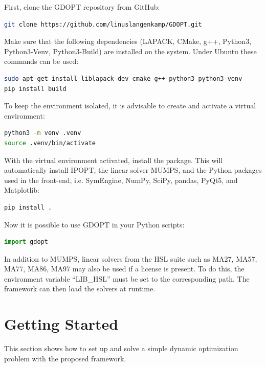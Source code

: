 \documentclass[12pt]{article}
\begin{document}
First, clone the GDOPT repository from GitHub:

\begin{lstlisting}[language=bash]
git clone https://github.com/linuslangenkamp/GDOPT.git
\end{lstlisting}

Make sure that the following dependencies (LAPACK, CMake, g++, Python3, Python3-Venv, Python3-Build) are installed on the system. Under Ubuntu these commands can be used:

\begin{lstlisting}[language=bash]
sudo apt-get install liblapack-dev cmake g++ python3 python3-venv
pip install build
\end{lstlisting}

To keep the environment isolated, it is advisable to create and activate a virtual environment:

\begin{lstlisting}[language=bash]
python3 -m venv .venv
source .venv/bin/activate
\end{lstlisting}

With the virtual environment activated, install the package. This will automatically install
IPOPT\cite{wachter2006implementation}, the linear solver MUMPS\cite{amestoy2001fully}, and the Python packages used in the front-end, i.e. SymEngine\cite{symengine}, NumPy\cite{harris2020array}, SciPy\cite{virtanen2020scipy}, pandas\cite{mckinney2010data}, PyQt5, and Matplotlib\cite{hunter2007matplotlib}:

\begin{lstlisting}[language=bash]
pip install .
\end{lstlisting}

Now it is possible to use GDOPT in your Python scripts:
\begin{lstlisting}[language=python]
import gdopt
\end{lstlisting}
In addition to MUMPS, linear solvers from the HSL suite such as MA27, MA57, MA77, MA86, MA97\cite{hsl2013collection} may also be used if a license is present. To do this, the environment variable “LIB\_HSL” must be set to the corresponding path. The framework can then load the solvers at runtime.

\section{Getting Started}
This section shows how to set up and solve a simple dynamic
optimization problem with the proposed framework.
\end{document}

